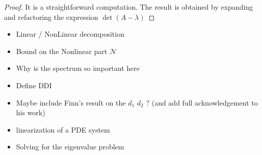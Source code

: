 %
%


\begin{proof}
	It is a straightforward computation. The result is obtained by expanding and refactoring the expression $\det(A - \lambda)$
\end{proof}

\begin{itemize}
    \item Linear / NonLinear decomposition
    \item Bound on the Nonlinear part $\mathcal N$
    
    \item Why is the spectrum so important here
    \item Define DDI
    \item Maybe include Finn's result on the $d_1$ $d_2$ ? (and add full acknowledgement to his work)
    \item linearization of a PDE system
    \item Solving for the eigenvalue problem   
\end{itemize}